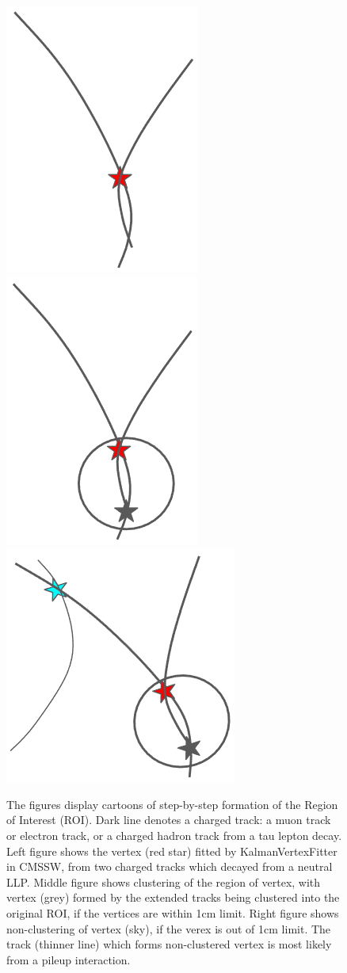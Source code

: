 \begin{figure}[h!]
  \centering
  \includegraphics[width=0.27\linewidth]{figs/MLP3.png}
  \includegraphics[width=0.27\linewidth]{figs/MLP2.png}
  \includegraphics[width=0.27\linewidth]{figs/MLP1.png}
\caption{The figures display cartoons of step-by-step formation of the Region of Interest (ROI). 
	Dark line denotes a charged track: a muon track or electron track, or a charged hadron track from a tau lepton decay. 
	Left figure shows the vertex (red star) fitted by KalmanVertexFitter in CMSSW, from two charged tracks which decayed from a neutral LLP.
	Middle figure shows clustering of the region of vertex, with vertex (grey) formed by the extended tracks being clustered into the original ROI, if the vertices are within 1cm limit.
	Right figure shows non-clustering of vertex (sky), if the verex is out of 1cm limit. The track (thinner line) which forms non-clustered vertex is most likely from a pileup interaction.
	}
  \label{fig:Clustering}
\end{figure}

